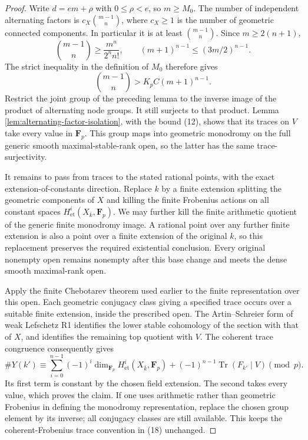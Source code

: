 \begin{proof}
Write $d=em+\rho$ with $0\leq\rho<e$, so $m\geq M_0$.
The number of independent alternating factors is
$c_X\binom{m-1}{n}$, where $c_X\geq1$ is the number of
geometric connected components.  In particular it is
at least $\binom{m-1}{n}$.
Since $m\geq2(n+1)$,
\[
 \binom{m-1}{n}\geq\frac{m^n}{2^n n!},
 \qquad
 (m+1)^{n-1}\leq(3m/2)^{n-1}.
 \]
The strict inequality in the definition of $M_0$ therefore
gives
\[
 \binom{m-1}{n}>K_pC(m+1)^{n-1}.
 \tag{17}
\]
Restrict the joint group of the preceding lemma to the
inverse image of the product of alternating node groups.
It still surjects to that product.  Lemma
\ref{lem:alternating-factor-isolation}, with the bound (12),
shows that its traces on $V$ take every value in
$\mathbf F_p$.  This group maps into geometric monodromy
on the full generic smooth maximal-stable-rank open, so
the latter has the same trace-surjectivity.

It remains to pass from traces to the stated rational
points, with the exact extension-of-constants direction.
Replace $k$ by a finite extension splitting the geometric
components of $X$ and killing the finite Frobenius actions
on all constant spaces
$H^i_{\mathrm{et}}(X_{\bar k},\mathbf F_p)$.
We may further kill the finite arithmetic quotient of
the generic finite monodromy image.  A rational point
over any further finite extension is also a point over a
finite extension of the original $k$, so this replacement
preserves the required existential conclusion.
Every original nonempty open remains nonempty after this
base change and meets the dense smooth maximal-rank open.

Apply the finite Chebotarev theorem used earlier
\cite[Theorem~9.7.13]{KatzSarnak1999} to the finite
representation over this open.  Each geometric conjugacy
class giving a specified trace occurs over a suitable
finite extension, inside the prescribed open.
The Artin--Schreier form of weak Lefschetz R1 identifies
the lower stable cohomology of the section with that of
$X$, and identifies the remaining top quotient with $V$.
The coherent trace congruence
\cite[Corollary~3.2]{Katz1973Congruence} consequently gives
\[
 \#Y(k')\equiv
  \sum_{i=0}^{n-1}(-1)^i
       \dim_{\mathbf F_p}H^i_{\mathrm{et}}(X_{\bar k},\mathbf F_p)
  +(-1)^{n-1}\operatorname{Tr}(F_{k'}\mid V)\pmod p.
 \tag{18}
\]
Its first term is constant by the chosen field extension.
The second takes every value, which proves the claim.
If one uses arithmetic rather than geometric Frobenius
in defining the monodromy representation, replace the
chosen group element by its inverse; all conjugacy classes
are still available.  This keeps the coherent-Frobenius
trace convention in (18) unchanged.
\end{proof}

